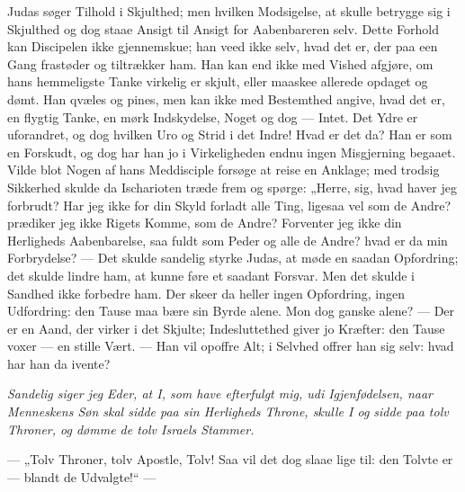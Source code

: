 \documentclass[12pt,a4paper]{book}
\begin{document}
Judas søger Tilhold i Skjulthed; men hvilken Modsigelse, at skulle betrygge sig i Skjulthed
og dog staae Ansigt til Ansigt for Aabenbareren selv. Dette Forhold kan Discipelen ikke
gjennemskue; han veed ikke selv, hvad det er, der paa een Gang frastøder og tiltrækker ham.
Han kan end ikke med Vished afgjøre, om hans hemmeligste Tanke virkelig er skjult, eller
maaskee allerede opdaget og dømt. Han qvæles og pines, men kan ikke med Bestemthed angive,
hvad det er, en flygtig Tanke, en mørk Indskydelse, Noget og dog --- Intet. Det Ydre er
uforandret, og dog hvilken Uro og Strid i det Indre! Hvad er det da? Han er som en Forskudt,
og dog har han jo i Virkeligheden endnu ingen Misgjerning begaaet. Vilde blot Nogen af hans
Meddisciple forsøge at reise en Anklage; med trodsig Sikkerhed skulde da Ischarioten træde
frem og spørge: „Herre, sig, hvad haver jeg forbrudt? Har jeg ikke for din Skyld forladt alle
Ting, ligesaa vel som de Andre? prædiker jeg ikke Rigets Komme, som de Andre? Forventer jeg
ikke
din Herligheds Aabenbarelse, saa fuldt som Peder og alle de Andre? hvad er da min
Forbrydelse? --- Det skulde sandelig styrke Judas, at møde en saadan Opfordring; det skulde
lindre ham, at kunne føre et saadant Forsvar. Men det skulde i Sandhed ikke forbedre ham. Der
skeer da heller ingen Opfordring, ingen Udfordring: den Tause maa bære sin Byrde alene. Mon
dog ganske alene? --- Der er en Aand, der virker i det Skjulte; Indesluttethed giver jo
Kræfter: den Tause voxer --- en stille Vært. --- Han vil opoffre Alt; i Selvhed offrer han
sig selv: hvad har han da ivente?

\emph{Sandelig siger jeg Eder, at I, som have efterfulgt mig, udi Igjenfødelsen, naar
Menneskens Søn skal sidde paa sin Herligheds Throne, skulle I og sidde paa tolv Throner, og
dømme de tolv Israels Stammer.}

--- „Tolv Throner, tolv Apostle, Tolv! Saa vil det dog slaae lige til: den Tolvte er ---
blandt de Udvalgte!“ ---
\end{document}
